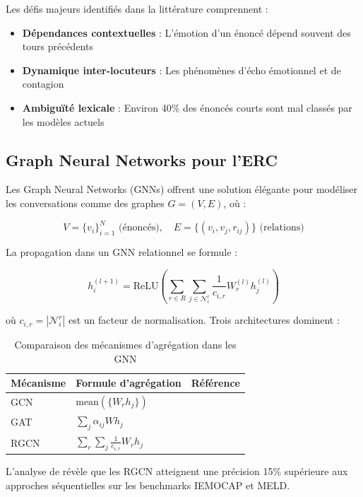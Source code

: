 \documentclass[a4paper,11pt]{article}
\begin{document}
Les défis majeurs identifiés dans la littérature comprennent :
\begin{itemize}
    \item \textbf{Dépendances contextuelles} : L'émotion d'un énoncé dépend souvent des tours précédents \cite{ghosal2019dialoguegcn}
    \item \textbf{Dynamique inter-locuteurs} : Les phénomènes d'écho émotionnel et de contagion \cite{navarretta2016mirroring}
    \item \textbf{Ambiguïté lexicale} : Environ 40\% des énoncés courts sont mal classés par les modèles actuels \cite{li2021survey}
\end{itemize}

\subsection{Graph Neural Networks pour l'ERC}
Les Graph Neural Networks (GNNs) offrent une solution élégante pour modéliser les conversations comme des graphes $G = (V,E)$, où :

\[
V = \{v_i\}_{i=1}^N \text{ (énoncés)}, \quad E = \{(v_i,v_j,r_{ij})\} \text{ (relations)}
\]

La propagation dans un GNN relationnel se formule :

\[
h_i^{(l+1)} = \text{ReLU}\left(\sum_{r\in R}\sum_{j\in\mathcal{N}_i^r}\frac{1}{c_{i,r}}W_r^{(l)}h_j^{(l)}\right)
\]

où $c_{i,r} = |\mathcal{N}_i^r|$ est un facteur de normalisation. Trois architectures dominent :

\begin{table}[ht] %
    \centering
    \begin{tabular}{lll}
        \toprule
        Mécanisme & Formule d'agrégation & Référence \\
        \midrule
        GCN & $\text{mean}(\{W_r h_j\})$ & \cite{kipf2016semi} \\
        GAT & $\sum_j \alpha_{ij} W h_j$ & \cite{velickovic2017graph} \\
        RGCN & $\sum_r\sum_j \frac{1}{c_{i,r}}W_r h_j$ & \cite{schlichtkrull2018modeling} \\
        \bottomrule
    \end{tabular}
    \caption{Comparaison des mécanismes d'agrégation dans les GNN}
    \label{tab:gnn_types}
\end{table}

L'analyse de \cite{zhang2021graph} révèle que les RGCN atteignent une précision 15\% supérieure aux approches séquentielles sur les benchmarks IEMOCAP et MELD.
\end{document}
